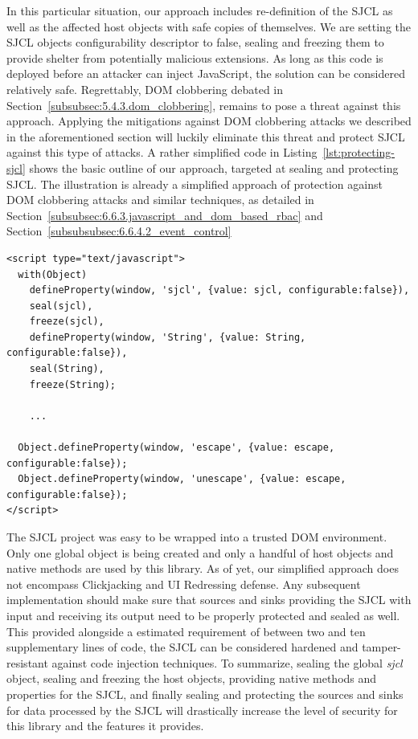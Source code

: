     In this particular situation, our approach includes re-definition of the SJCL as well as the affected host objects with safe copies of themselves. We are setting the SJCL objects configurability descriptor to false, sealing and freezing them to provide shelter from potentially malicious extensions. As long as this code is deployed before an attacker can inject JavaScript, the solution can be considered relatively safe. Regrettably, DOM clobbering debated in Section~\ref{subsubsec:5.4.3.dom_clobbering}, remains to pose a threat against this approach. Applying the mitigations against DOM clobbering attacks we described in the aforementioned section will luckily eliminate this threat and protect SJCL against this type of attacks. A rather simplified code in Listing~\ref{lst:protecting-sjcl} shows the basic outline of our approach, targeted at sealing and protecting SJCL. The illustration is already a simplified approach of protection against DOM clobbering attacks and similar techniques, as detailed in Section~\ref{subsubsec:6.6.3.javascript_and_dom_based_rbac} and Section~\ref{subsubsubsec:6.6.4.2_event_control}

\begin{lstlisting}[captionpos=b,caption=Protecting SJCL with ES5 and a frozen DOM, label=lst:protecting-sjcl]
<script type="text/javascript">
  with(Object)
    defineProperty(window, 'sjcl', {value: sjcl, configurable:false}),
    seal(sjcl),
    freeze(sjcl),
    defineProperty(window, 'String', {value: String, configurable:false}),
    seal(String),
    freeze(String);

    ...

  Object.defineProperty(window, 'escape', {value: escape, configurable:false});
  Object.defineProperty(window, 'unescape', {value: escape, configurable:false});
</script>
\end{lstlisting}

    The SJCL project was easy to be wrapped into a trusted DOM environment. Only one global object is being created and only a handful of host objects and native methods are used by this library. As of yet, our simplified approach does not encompass Clickjacking and UI Redressing defense. Any subsequent implementation should make sure that  sources and sinks providing the SJCL with input and receiving its output need to be properly protected and sealed as well. This provided alongside a estimated requirement of between two and ten supplementary lines of code, the SJCL can be considered hardened and tamper-resistant against code injection techniques. To summarize, sealing the global \textit{sjcl} object, sealing and freezing the host objects, providing native methods and properties for the SJCL, and finally sealing and protecting the sources and sinks for data processed by the SJCL will drastically increase the level of security for this library and the features it provides.\\

